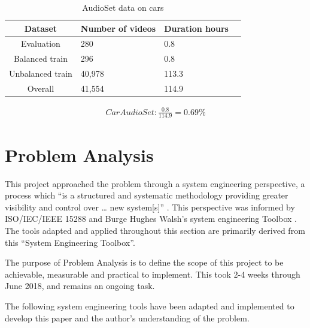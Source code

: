 \documentclass{UoNMCHA}
\newcommand{\inlineQuote}[1]{``#1''}
\numberwithin{equation}{section}
\begin{document}
\begin{table}[h!]
    \begin{center}
        \caption{AudioSet data on cars}\label{tab:AudioSetCars}
        {\footnotesize
            \begin{tabular}{c l l l|}
                \hline\hline Dataset & Number of videos & Duration hours \\ \hline 
                Evaluation & 280 & 0.8 \\
                Balanced train & 296 & 0.8 \\
                Unbalanced train & 40,978 & 113.3 \\
                Overall & 41,554 & 114.9 \\
                \hline
            \end{tabular}
        }
    \end{center}
\end{table}
\begin{gather*}
    Car AudioSet:  \frac{0.8}{114.9}=0.69\%
\end{gather*}

\clearpage \section{Problem Analysis}\label{sec:ProblemAnalysis}

This project approached the problem through a system engineering perspective, a process which “is a structured and systematic methodology providing greater visibility and control over … new system[s]” \cite{limited2018systems}. This perspective was informed by ISO/IEC/IEEE 15288 \cite{IEEE15288} and Burge Hughes Walsh’s system engineering Toolbox \cite{SysThink2015}. The tools adapted and applied throughout this section are primarily derived from this \inlineQuote{System Engineering Toolbox}. 

The purpose of Problem Analysis is to define the scope of this project to be achievable, measurable and practical to implement. This took 2-4 weeks through June 2018, and remains an ongoing task. 

The following system engineering tools have been adapted and implemented to develop this paper and the author’s understanding of the problem. 
\end{document}
